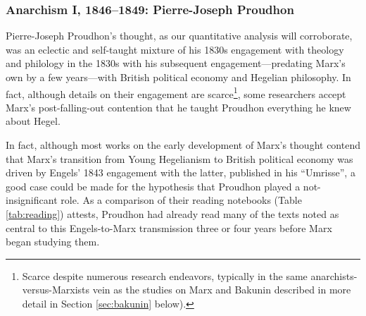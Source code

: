 \subsubsection{Anarchism I, 1846--1849: Pierre-Joseph Proudhon\label{sec:proudhon}}

Pierre-Joseph Proudhon's thought, as our quantitative analysis will corroborate, 
was an eclectic and self-taught mixture of his 1830s engagement with theology and philology in the 1830s with his subsequent engagement---predating Marx's own by a few years---with British political economy and Hegelian philosophy. In fact, although details on their engagement are scarce\footnote{Scarce despite numerous research endeavors, typically in the same anarchists-versus-Marxists vein as the studies on Marx and Bakunin described in more detail in Section \ref{sec:bakunin} below).}, some researchers accept Marx's post-falling-out contention that he taught Proudhon everything he knew about Hegel.

In fact, although most works on the early development of Marx's thought contend that Marx's transition from Young Hegelianism to British political economy was driven by Engels' 1843 engagement with the latter, published in his ``Umrisse'', a good case could be made for the hypothesis that Proudhon played a not-insignificant role. As a comparison of their reading notebooks (Table \ref{tab:reading}) attests, Proudhon had already read many of the texts noted as central to this Engels-to-Marx transmission three or four years before Marx began studying them.


